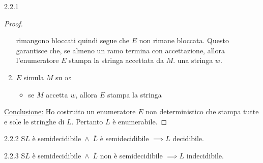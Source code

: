 \documentclass{article}  %
\theoremstyle{definition}
\begin{document}
\begin{theorem}{2.2.1}
\begin{proof}
\begin{enumerate}
{				      rimangono bloccati quindi segue che $E$ non rimane bloccata. Questo garantisce che, se almeno un ramo termina con accettazione, allora l'enumeratore $E$ stampa la stringa
				      accettata da $M$.
			      } una stringa $w$.
			\item $E$ simula $M$ su $w$:
			      \begin{itemize}
				      \item se $M$ accetta $w$, allora $E$ stampa la stringa
			      \end{itemize}
		\end{enumerate}
		\underline{Conclusione:} Ho costruito un enumeratore $E$ non deterministico che stampa tutte e sole le stringhe di $L$. Pertanto $L$ è enumerabile.
	\end{proof}
\end{theorem}
\begin{theorem}{2.2.2}
	S$L$ è semidecidibile$\;\wedge\; \overline{L}$ è semidecidibile $\implies L$ decidibile.
\end{theorem}
\begin{theorem}{2.2.3}
	S$L$ è semidecidibile$\;\wedge\; \overline{L}$ non è semidecidibile $\implies L$ indecidibile.
\end{theorem}

\end{document}
